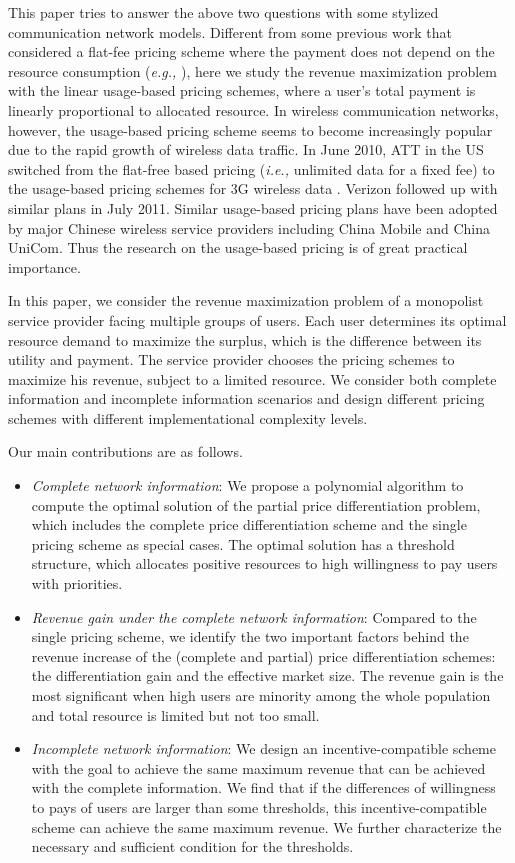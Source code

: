 \documentclass[twocolumn,10pt,twosided]{IEEEtran}
\newcommand{\eg}{\emph{e.g., }}
\newcommand{\ie}{\emph{i.e., }}
\begin{document}
This paper tries to answer the above two questions with some stylized communication network models.
Different from some previous work that considered a flat-fee pricing scheme where the payment does not depend on the resource consumption (\eg \cite{acemoglu2004marginal,gibbens2000internet, shakkottai2008price}), here we study the revenue maximization problem with the linear usage-based pricing schemes, where a user's total payment is linearly proportional to allocated resource. In  wireless communication networks, however, the usage-based pricing scheme seems to become increasingly popular due to the rapid growth of wireless data traffic. In June 2010,  ATT in the US switched from the flat-free based pricing (\ie unlimited data  for a fixed fee) to the  usage-based pricing schemes for 3G wireless data \cite{news1}.  Verizon followed up with similar plans in July 2011. Similar usage-based pricing plans have been adopted by major Chinese wireless service providers including China Mobile and China UniCom.
Thus the research on the usage-based pricing is of great practical importance.

In this paper,  we consider the revenue maximization problem of a monopolist service provider facing multiple groups of users. Each user determines its optimal resource demand to maximize the surplus, which is the difference between its utility and payment. The service provider chooses the pricing schemes to maximize his revenue, subject to a limited resource. We consider both complete information and incomplete information scenarios and design different pricing schemes with different implementational complexity levels.

Our main contributions are as follows.
\begin{itemize}
    \item \emph{Complete network information}: We propose a polynomial algorithm to compute the optimal solution of the partial price differentiation problem, which includes the complete price differentiation scheme and the single pricing scheme as special cases. The optimal solution has a threshold structure, which allocates positive resources to high willingness to pay users with priorities.
	 \item \emph{Revenue gain under the complete network information}: Compared to the single pricing scheme, we identify the two important factors behind the revenue increase of the (complete and partial) price differentiation schemes: the differentiation gain and the effective market size. The revenue gain is the most significant when high users are minority among the whole population and total resource is limited but not too small.
	 \item \emph{Incomplete network information}: We design an incentive-compatible scheme with the goal to achieve the same maximum revenue that can be achieved with the complete information. We find that if the differences of willingness to pays of users are larger than some thresholds, this incentive-compatible scheme can achieve the same maximum revenue. We further characterize the necessary and sufficient condition for the thresholds.
\end{itemize}
\end{document}
